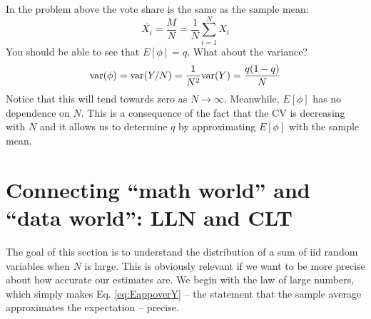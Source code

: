 In the problem above the vote share is the same as the sample mean:
\begin{equation*}
\overline{X_i} = \frac{M}{N} =  \frac{1}{N}\sum_{i=1}^NX_i
\end{equation*}
You should be able to see that $E[\phi] = q$. What about the variance? 
 \begin{equation*}
{\rm var}(\phi) = {\rm var}(Y/N) = \frac{1}{N^2}{\rm var}(Y) = \frac{q(1-q)}{N}
 \end{equation*}
 Notice that this will tend towards zero as $N \to \infty$. Meanwhile, $E[\phi]$ has no dependence on $N$. This is a consequence of the fact that the CV is decreasing with $N$ and it allows us to determine $q$ by approximating $E[\phi]$ with the sample mean.








 \section{Connecting ``math world'' and ``data world'': LLN and CLT}\label{sec:llnclt}
 The goal of this section is to understand the distribution of a sum of iid random variables when $N$ is large. This is obviously relevant if we want to be more precise about how accurate our estimates are. We begin with the law of large numbers, which simply makes Eq. \ref{eq:EappoverY} -- the statement that the sample average approximates the expectation -- precise. 
 
